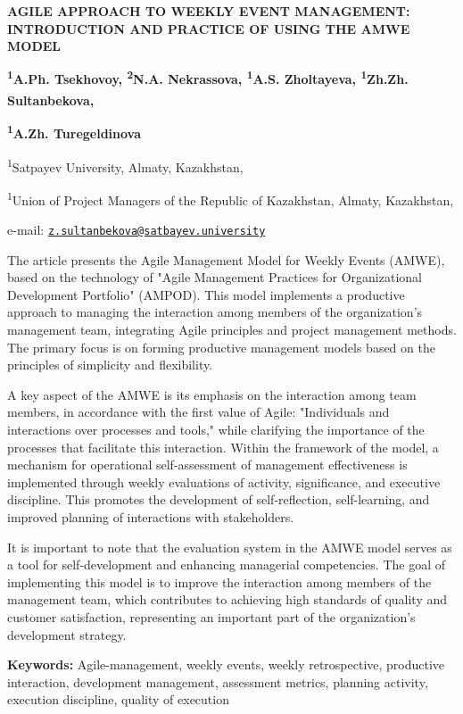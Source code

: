 {\bfseries AGILE APPROACH TO WEEKLY EVENT MANAGEMENT: INTRODUCTION AND
PRACTICE OF USING THE AMWE MODEL}

{\bfseries \textsuperscript{1}A.Ph. Tsekhovoy, \textsuperscript{2}N.A.
Nekrassova, \textsuperscript{1}A.S. Zholtayeva,
\textsuperscript{1}Zh.Zh. Sultanbekova\textsuperscript{\envelope },}

{\bfseries \textsuperscript{1}A.Zh. Turegeldinova}

\textsuperscript{1}Satpayev University, Almaty, Kazakhstan,

\textsuperscript{1}Union of Project Managers of the Republic of
Kazakhstan, Almaty, Kazakhstan,

e-mail:
\href{mailto:z.sultanbekova@satbayev.university}{\nolinkurl{z.sultanbekova@satbayev.university}}

The article presents the Agile Management Model for Weekly Events
(AMWE), based on the technology of "Agile Management Practices for
Organizational Development Portfolio" (AMPOD). This model implements a
productive approach to managing the interaction among members of the
organization's management team, integrating Agile principles and project
management methods. The primary focus is on forming productive
management models based on the principles of simplicity and flexibility.

A key aspect of the AMWE is its emphasis on the interaction among team
members, in accordance with the first value of Agile: "Individuals and
interactions over processes and tools," while clarifying the importance
of the processes that facilitate this interaction. Within the framework
of the model, a mechanism for operational self-assessment of management
effectiveness is implemented through weekly evaluations of activity,
significance, and executive discipline. This promotes the development of
self-reflection, self-learning, and improved planning of interactions
with stakeholders.

It is important to note that the evaluation system in the AMWE model
serves as a tool for self-development and enhancing managerial
competencies. The goal of implementing this model is to improve the
interaction among members of the management team, which contributes to
achieving high standards of quality and customer satisfaction,
representing an important part of the organization's development
strategy.

{\bfseries Keywords:} Agile-management, weekly events, weekly
retrospective, productive interaction, development management,
assessment metrics, planning activity, execution discipline, quality of
execution

